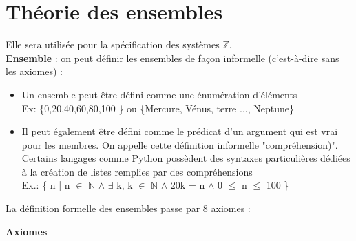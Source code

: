 \section{Théorie des ensembles}
Elle sera utilisée pour la spécification des systèmes $\mathbb{Z}$.\\

\textbf{Ensemble} : on peut définir les ensembles de façon informelle (c'est-à-dire sans les axiomes) : \\
\begin{itemize}
\item Un ensemble peut être défini comme une énumération d'éléments \\
Ex: \{0,20,40,60,80,100 \} ou \{Mercure, Vénus, terre ..., Neptune\}
\item Il peut également être défini comme le prédicat d'un argument qui est vrai pour les membres. On appelle cette définition informelle "compréhension)". Certains langages comme Python possèdent des syntaxes particulières dédiées à la création de listes remplies par des compréhensions\\
Ex.: \{ n | n $\in$ $\mathbb{N}$ $\wedge$ $\exists$ k, k $\in$ $\mathbb{N}$ $\wedge$ 20k = n $\wedge$ 0 $\leq$ n $\leq$ 100 \} \\
\end{itemize}
La définition formelle des ensembles passe par 8 axiomes :

\textbf{Axiomes}

